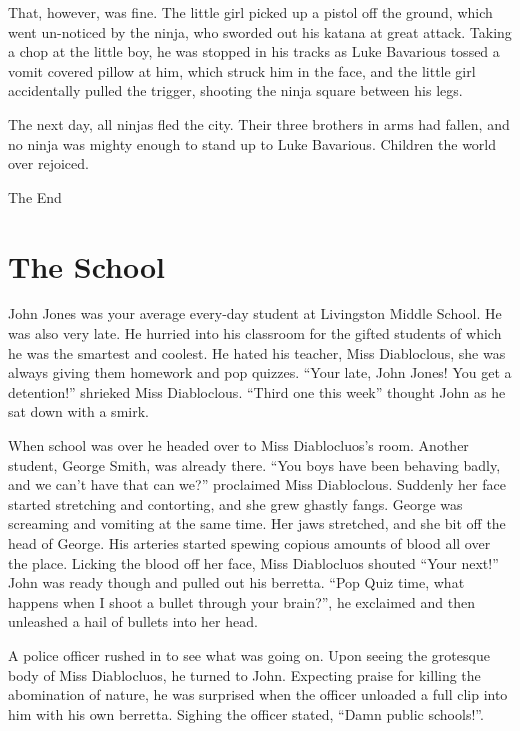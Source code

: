 That, however, was fine. The little girl picked up a pistol off the
ground, which went un-noticed by the ninja, who sworded out his
katana at great attack. Taking a chop at the little boy, he was
stopped in his tracks as Luke Bavarious tossed a vomit covered
pillow at him, which struck him in the face, and the little girl
accidentally pulled the trigger, shooting the ninja square between
his legs.



The next day, all ninjas fled the city. Their three brothers in
arms had fallen, and no ninja was mighty enough to stand up to Luke
Bavarious. Children the world over rejoiced.



The End
 



\chapter{The School}


John Jones was your average every-day student at Livingston Middle
School. He was also very late. He hurried into his classroom for
the gifted students of which he was the smartest and coolest. He
hated his teacher, Miss Diabloclous, she was always giving them
homework and pop quizzes. ``Your late, John Jones! You get a
detention!'' shrieked Miss Diabloclous. ``Third one this
week'' thought John as he sat down with a smirk.



When school was over he headed over to Miss Diablocluos's
room. Another student, George Smith, was already there. ``You
boys have been behaving badly, and we can't have that can
we?'' proclaimed Miss Diabloclous. Suddenly her face started
stretching and contorting, and she grew ghastly fangs. George was
screaming and vomiting at the same time. Her jaws stretched, and
she bit off the head of George. His arteries started spewing
copious amounts of blood all over the place. Licking the blood off
her face, Miss Diablocluos shouted ``Your next!'' John
was ready though and pulled out his berretta. ``Pop Quiz time,
what happens when I shoot a bullet through your brain?'', he
exclaimed and then unleashed a hail of bullets into her head.



A police officer rushed in to see what was going on. Upon seeing
the grotesque body of Miss Diablocluos, he turned to John.
Expecting praise for killing the abomination of nature, he was
surprised when the officer unloaded a full clip into him with his
own berretta. Sighing the officer stated, ``Damn public
schools!''. 
 



